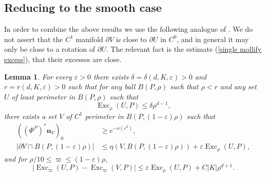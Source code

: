 \documentclass[reqno,11pt]{amsart}
\DeclareMathOperator{\Exc}{Exc}
\newcommand{\normal}{\mathbf n}
\newtheorem{lemma}[theorem]{Lemma}
\theoremstyle{definition}
\numberwithin{equation}{section}
\begin{document}
\subsection{Reducing to the smooth case}
In order to combine the above results we use the following analogue of \cite[Lemma 7.5]{Giusti77}.
We do not assert that the $C^1$ manifold $\partial V$ is close to $\partial U$ in $C^0$, and in general it may only be close to a rotation of $\partial U$. The relevant fact is the estimate (\ref{single mollify excess}), that their excesses are close.

\begin{lemma}\label{single mollify}
For every $\varepsilon > 0$ there exists $\delta = \delta(d, K, \varepsilon) > 0$ and $r = r(d, K, \varepsilon) > 0$ such that for any ball $B(P, \rho)$ such that $\rho < r$ and any set $U$ of least perimeter in $B(P, \rho)$ such that
$$\Exc_\rho (U, P) \leq \delta \rho^{d - 1},$$
there exists a set $V$ of $C^1$ perimeter in $B(P, (1 - \varepsilon)\rho)$ such that
\begin{align}
((\Phi^P)^* \normal_V)_0 &\geq e^{-o(\varepsilon^2)}, \label{single mollify normal}\\
|\partial V \cap B(P, (1 - \varepsilon)\rho)| &\leq \eta(V, B(P, (1 - \varepsilon)\rho)) + \varepsilon \Exc_\rho (U, P), \label{single mollify minimality}
\end{align}
and for $\rho/10 \leq \varpi \leq (1 - \varepsilon)\rho$,
\begin{equation}
|\Exc_\varpi (U, P) - \Exc_\varpi (V, P)| \leq \varepsilon \Exc_\rho (U, P) + C|K| \rho^{d + 1}. \label{single mollify excess}
\end{equation}
\end{lemma}
\end{document}
